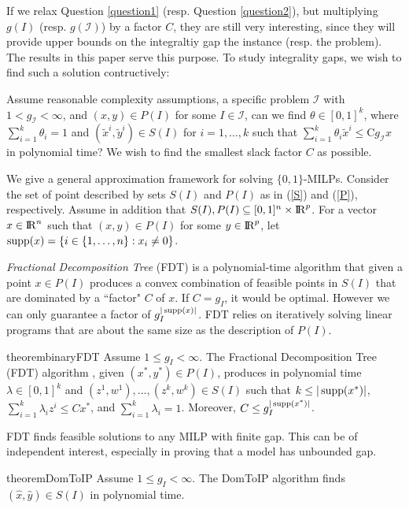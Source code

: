 If we relax Question \ref{question1} (resp. Question \ref{question2}), but multiplying $g(I)$ (resp. $g(\mathcal{I})$) by a factor $C$, they are still very interesting, since they will provide upper bounds on the integraltiy gap the instance (resp. the problem). The results in this paper serve this purpose.
\fi
To study integrality gaps, we wish to find such a solution contructively:
\begin{question}\label{question2}
	Assume reasonable complexity assumptions, a specific problem $\mathcal{I}$ with  $1<g_{\mathcal{I}}<\infty$, and $(x,y)\in P(I)$ for some $I\in \mathcal{I}$, can we find $\theta \in [0,1]^k$, where $\sum_{i=1}^{k}\theta_i =1$ and $(\tilde{x}^i,\tilde{y}^i)\in S(I)$ for $i=1,\ldots,k$ such that $\sum_{i=1}^{k}\theta_i \tilde{x}^i\leq $C$ g_{\mathcal{I}}x$ in polynomial time? We wish to find the smallest slack factor $C$ as possible.
\end{question}

We give a general approximation framework for solving $\{0,1\}$-MILPs.  Consider the set of point described by sets $S(I)$ and $P(I)$ as in (\ref{S}) and (\ref{P}), respectively. Assume in addition that $S(I),P(I)\subseteq [0,1]^n\times {\rm I\!R}^p$. For a vector $x\in {\rm I\!R}^n$ such that $(x,y)\in P(I)$ for some $y\in {\rm I\!R}^p$, let $\operatorname{supp}(x)= \{i \in \{1,\ldots,n\}: x_i \neq 0\}$. 


\textit{Fractional Decomposition Tree} (FDT) is a polynomial-time algorithm that given a point $x\in P(I)$ produces a convex combination of feasible points in $S(I)$ that are dominated by a ``factor" $C$ of $x$. If $C = g_I$, it would be optimal. However we can only guarantee a factor of $g_I^{|\operatorname{supp}(x)|}$. FDT relies on iteratively solving linear programs that are about the same size as the description of $P(I)$.

\begin{restatable}{theorem}{binaryFDT}
	\label{binaryFDT}
	Assume $1\leq g_I 	<\infty$. 	
	The Fractional Decomposition Tree (FDT) algorithm , given $(x^*,y^*)\in P(I)$, produces in polynomial time $\lambda\in [0,1]^k$ and $(z^1,w^1),\ldots,(z^k,w^k) \in S(I)$ such that $k\leq |\operatorname{supp}(x^*)|$, $\sum_{i=1}^{k}\lambda_i z^i\leq Cx^*$, and $\sum_{i=1}^{k}\lambda_i = 1$. Moreover, $C\leq g_I^{|\operatorname{supp}(x^*)|}$.
\end{restatable}

FDT finds feasible solutions to any MILP with finite gap. This can be of independent interest, especially in proving that a model has unbounded gap.
\begin{restatable}{theorem}{DomToIP}
	\label{domtoIP}
	Assume $1\leq g_I < \infty$. The DomToIP algorithm finds $(\hat{x},\hat{y})\in S(I)$ in polynomial time.
\end{restatable}

